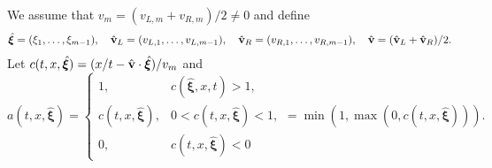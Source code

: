 \documentclass{article}
\newcommand{\bfxi}{ {\bm \xi} }
\newcommand{\E}{ \mathbb E }
\newcommand{\diff}{ \; \text{d} }
\begin{document}
%
%
We assume that $v_m=(v_{L,m}+v_{R,m})/2\neq0$ and define 
\begin{align}
    \hat\bfxi=(\xi_1,\dots,\xi_{m-1}), 
    \quad
    \hat{\bf v}_L=(v_{L,1},\dots,v_{L,m-1}),
    \quad
    \hat{\bf v}_R=(v_{R,1},\dots,v_{R,m-1}),
    \quad
    \hat{\bf v}=(\hat{\bf v}_L+\hat{\bf v}_R)/2.
\end{align}
Let $c(t,x,\hat\bfxi)=(x/t-\hat{\bf{v}}\cdot\hat\bfxi)/v_m$ and
\begin{equation}
    a(t,x,\hat \bfxi) = \begin{cases}
        1,      & c(\hat \bfxi,x,t) > 1,
        \\
        c(t,x,\hat \bfxi),  & 0 < c(t,x,\hat \bfxi) < 1,
        \\
        0,  &  c(t,x,\hat \bfxi) < 0
    \end{cases}
    = \min\left(1, \max\left(0, c(t,x,\hat \bfxi)\right)\right).
\end{equation}
\end{document}
